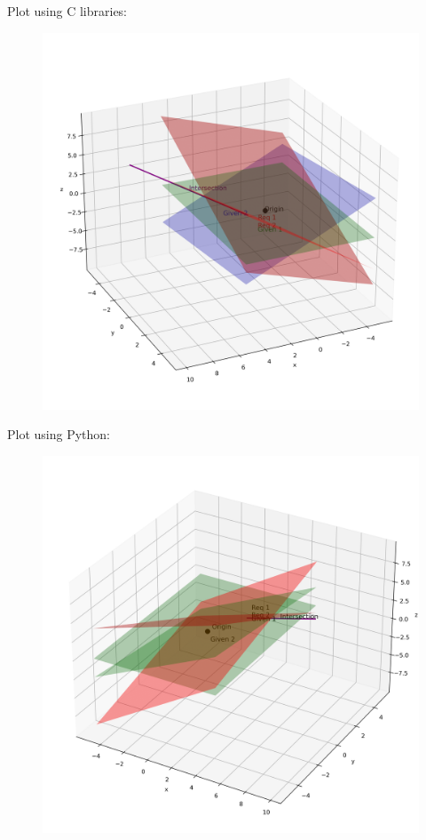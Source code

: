 \documentclass[journal,12pt,onecolumn]{IEEEtran}
\begin{document}
Plot using C libraries:
\begin{figure}[H]
	\centering
	\includegraphics[scale=0.5]{img1}
	\caption*{}
	\label{img1}
\end{figure}
Plot using Python:
\begin{figure}[H]
	\centering
	\includegraphics[scale=0.5]{img2}
	\caption*{}
	\label{img2}
\end{figure}
\end{document}
